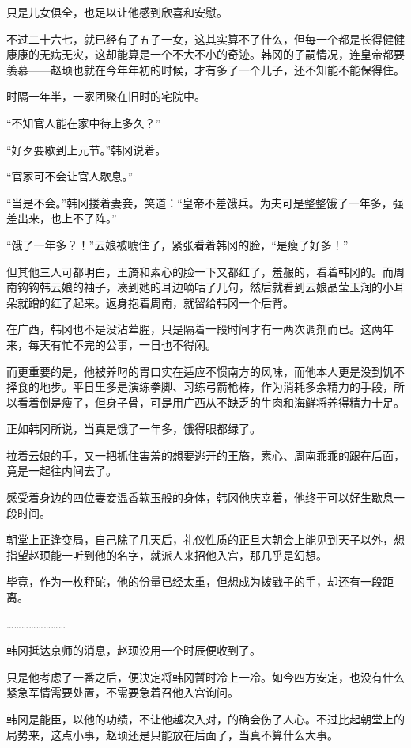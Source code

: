 只是儿女俱全，也足以让他感到欣喜和安慰。

不过二十六七，就已经有了五子一女，这其实算不了什么，但每一个都是长得健健康康的无病无灾，这却能算是一个不大不小的奇迹。韩冈的子嗣情况，连皇帝都要羡慕——赵顼也就在今年年初的时候，才有多了一个儿子，还不知能不能保得住。

时隔一年半，一家团聚在旧时的宅院中。

“不知官人能在家中待上多久？”

“好歹要歇到上元节。”韩冈说着。

“官家可不会让官人歇息。”

“当是不会。”韩冈搂着妻妾，笑道：“皇帝不差饿兵。为夫可是整整饿了一年多，强差出来，也上不了阵。”

“饿了一年多？！”云娘被唬住了，紧张看着韩冈的脸，“是瘦了好多！”

但其他三人可都明白，王旖和素心的脸一下又都红了，羞赧的，看着韩冈的。而周南钩钩韩云娘的袖子，凑到她的耳边嘀咕了几句，然后就看到云娘晶莹玉润的小耳朵就蹭的红了起来。返身抱着周南，就留给韩冈一个后背。

在广西，韩冈也不是没沾荤腥，只是隔着一段时间才有一两次调剂而已。这两年来，每天有忙不完的公事，一日也不得闲。

而更重要的是，他被养叼的胃口实在适应不惯南方的风味，而他本人更是没到饥不择食的地步。平日里多是演练拳脚、习练弓箭枪棒，作为消耗多余精力的手段，所以看着倒是瘦了，但身子骨，可是用广西从不缺乏的牛肉和海鲜将养得精力十足。

正如韩冈所说，当真是饿了一年多，饿得眼都绿了。

拉着云娘的手，又一把抓住害羞的想要逃开的王旖，素心、周南乖乖的跟在后面，竟是一起往内间去了。

感受着身边的四位妻妾温香软玉般的身体，韩冈他庆幸着，他终于可以好生歇息一段时间。

朝堂上正逢变局，自己除了几天后，礼仪性质的正旦大朝会上能见到天子以外，想指望赵顼能一听到他的名字，就派人来招他入宫，那几乎是幻想。

毕竟，作为一枚秤砣，他的份量已经太重，但想成为拨戥子的手，却还有一段距离。

……………………

韩冈抵达京师的消息，赵顼没用一个时辰便收到了。

只是他考虑了一番之后，便决定将韩冈暂时冷上一冷。如今四方安定，也没有什么紧急军情需要处置，不需要急着召他入宫询问。

韩冈是能臣，以他的功绩，不让他越次入对，的确会伤了人心。不过比起朝堂上的局势来，这点小事，赵顼还是只能放在后面了，当真不算什么大事。

